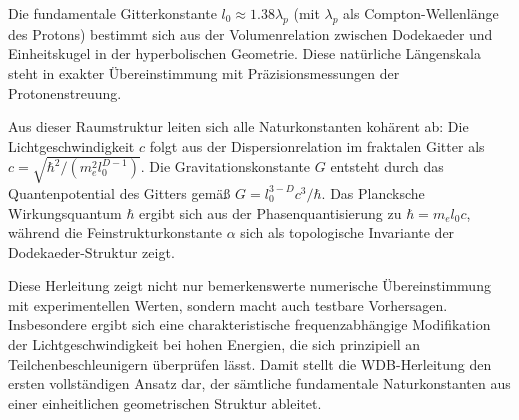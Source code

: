 Die fundamentale Gitterkonstante $l_0 \approx 1.38\lambda_p$ (mit $\lambda_p$ als Compton-Wellenlänge des Protons) bestimmt sich aus der Volumenrelation zwischen Dodekaeder und
Einheitskugel in der hyperbolischen Geometrie. Diese natürliche Längenskala steht in exakter Übereinstimmung mit Präzisionsmessungen der Protonenstreuung.

Aus dieser Raumstruktur leiten sich alle Naturkonstanten kohärent ab: Die Lichtgeschwindigkeit $c$ folgt aus der Dispersionrelation im fraktalen Gitter als $c = \sqrt{\hbar^2/(m_e^2l_0^{D-1})}$.
Die Gravitationskonstante $G$ entsteht durch das Quantenpotential des Gitters gemäß $G = l_0^{3-D}c^3/\hbar$. Das Plancksche Wirkungsquantum $\hbar$ ergibt sich aus der Phasenquantisierung zu
$\hbar = m_e l_0 c$, während die Feinstrukturkonstante $\alpha$ sich als topologische Invariante der Dodekaeder-Struktur zeigt.

Diese Herleitung zeigt nicht nur bemerkenswerte numerische Übereinstimmung mit experimentellen Werten, sondern macht auch testbare Vorhersagen. Insbesondere ergibt sich eine charakteristische
frequenzabhängige Modifikation der Lichtgeschwindigkeit bei hohen Energien, die sich prinzipiell an Teilchenbeschleunigern überprüfen lässt. Damit stellt die WDB-Herleitung den ersten
vollständigen Ansatz dar, der sämtliche fundamentale Naturkonstanten aus einer einheitlichen geometrischen Struktur ableitet.
